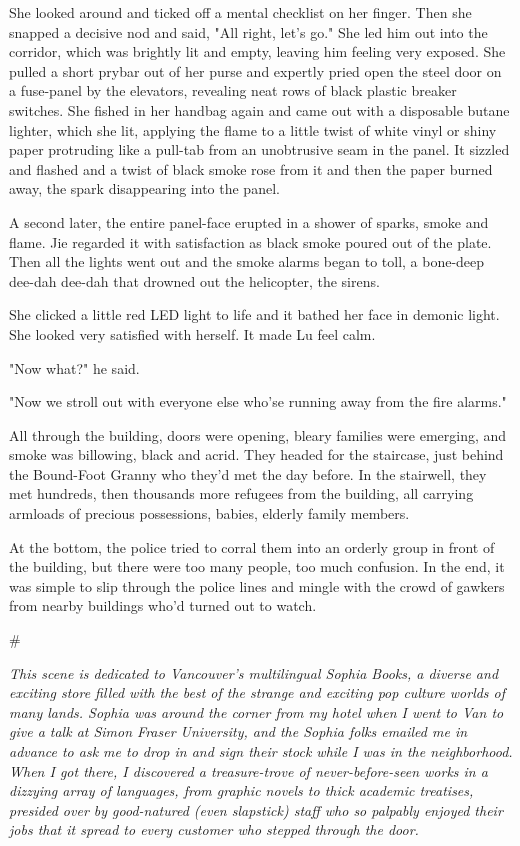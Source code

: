 She looked around and ticked off a mental checklist on her finger.
Then she snapped a decisive nod and said, "All right, let's go."
She led him out into the corridor, which was brightly lit and
empty, leaving him feeling very exposed. She pulled a short prybar
out of her purse and expertly pried open the steel door on a
fuse-panel by the elevators, revealing neat rows of black plastic
breaker switches. She fished in her handbag again and came out with
a disposable butane lighter, which she lit, applying the flame to a
little twist of white vinyl or shiny paper protruding like a
pull-tab from an unobtrusive seam in the panel. It sizzled and
flashed and a twist of black smoke rose from it and then the paper
burned away, the spark disappearing into the panel.

A second later, the entire panel-face erupted in a shower of
sparks, smoke and flame. Jie regarded it with satisfaction as black
smoke poured out of the plate. Then all the lights went out and the
smoke alarms began to toll, a bone-deep dee-dah dee-dah that
drowned out the helicopter, the sirens.

She clicked a little red LED light to life and it bathed her face
in demonic light. She looked very satisfied with herself. It made
Lu feel calm.

"Now what?" he said.

"Now we stroll out with everyone else who'se running away from the
fire alarms."

All through the building, doors were opening, bleary families were
emerging, and smoke was billowing, black and acrid. They headed for
the staircase, just behind the Bound-Foot Granny who they'd met the
day before. In the stairwell, they met hundreds, then thousands
more refugees from the building, all carrying armloads of precious
possessions, babies, elderly family members.

At the bottom, the police tried to corral them into an orderly
group in front of the building, but there were too many people, too
much confusion. In the end, it was simple to slip through the
police lines and mingle with the crowd of gawkers from nearby
buildings who'd turned out to watch.

\#

\emph{This scene is dedicated to Vancouver's multilingual Sophia Books, a diverse and exciting store filled with the best of the strange and exciting pop culture worlds of many lands. Sophia was around the corner from my hotel when I went to Van to give a talk at Simon Fraser University, and the Sophia folks emailed me in advance to ask me to drop in and sign their stock while I was in the neighborhood. When I got there, I discovered a treasure-trove of never-before-seen works in a dizzying array of languages, from graphic novels to thick academic treatises, presided over by good-natured (even slapstick) staff who so palpably enjoyed their jobs that it spread to every customer who stepped through the door.}

